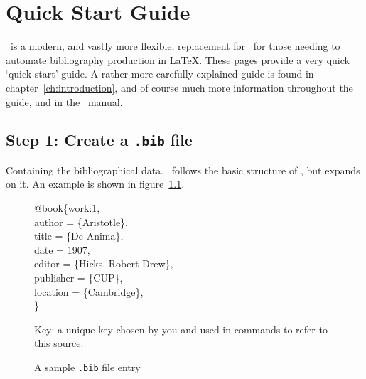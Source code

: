 \chapter{Quick Start Guide}\label{ch:quickstart}

\biblatex\ is a modern, and vastly more flexible, replacement for
\bibtex\ for those needing to automate bibliography production in
\LaTeX. These pages provide a very quick `quick start' guide. A rather
more carefully explained guide is found in
chapter~\ref{ch:introduction}, and of course much more information
throughout the guide, and in the \biblatex\ manual.


\section{Step 1: Create a \texttt{.bib} file}
Containing the bibliographical data. \biblatex\ follows the basic
structure of \bibtex, but expands on
it. An example is shown in figure~\ref{quickstart:bib}.

\begin{figure}
\strut
  \begin{minipage}[t]{0.7\linewidth}
    \ttfamily
 @book\{\colorbox{blue!15}{work:1},\\
  author       = \{Aristotle\},\\
  title        = \{De Anima\},\\
  date         = 1907,\\
  editor       = \{Hicks, Robert Drew\},\\
  publisher    = \{CUP\},\\
  location     = \{Cambridge\},\\
\}\\
\end{minipage}\begin{minipage}[t]{0.7\linewidth}
  \small\sffamily\strut\vspace{1pc}

   Key: a unique
key chosen by you and used in  commands to refer to this
source.
\end{minipage}
\caption{A sample \texttt{.bib} file entry}
\label{quickstart:bib}
\end{figure}

